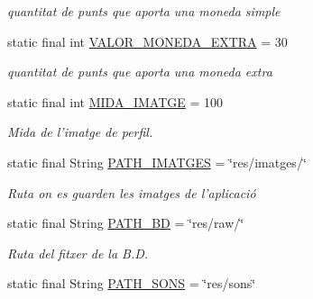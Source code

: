 \begin{DoxyCompactItemize}
\begin{DoxyCompactList}\small\item\em quantitat de punts que aporta una moneda simple \end{DoxyCompactList}\item 
\hypertarget{classlogica_1_1_utils_1_1_constants_a705b60aac1d5b26f649dfd4f140f58f5}{static final int \hyperlink{classlogica_1_1_utils_1_1_constants_a705b60aac1d5b26f649dfd4f140f58f5}{V\+A\+L\+O\+R\+\_\+\+M\+O\+N\+E\+D\+A\+\_\+\+E\+X\+T\+R\+A} = 30}\label{classlogica_1_1_utils_1_1_constants_a705b60aac1d5b26f649dfd4f140f58f5}

\begin{DoxyCompactList}\small\item\em quantitat de punts que aporta una moneda extra \end{DoxyCompactList}\item 
\hypertarget{classlogica_1_1_utils_1_1_constants_a4712ee7a7b1d5c05c32a6cdb6f70b86e}{static final int \hyperlink{classlogica_1_1_utils_1_1_constants_a4712ee7a7b1d5c05c32a6cdb6f70b86e}{M\+I\+D\+A\+\_\+\+I\+M\+A\+T\+G\+E} = 100}\label{classlogica_1_1_utils_1_1_constants_a4712ee7a7b1d5c05c32a6cdb6f70b86e}

\begin{DoxyCompactList}\small\item\em Mida de l'imatge de perfil. \end{DoxyCompactList}\item 
\hypertarget{classlogica_1_1_utils_1_1_constants_a442521d8c78352f361b4b8c35916c0cb}{static final String \hyperlink{classlogica_1_1_utils_1_1_constants_a442521d8c78352f361b4b8c35916c0cb}{P\+A\+T\+H\+\_\+\+I\+M\+A\+T\+G\+E\+S} = \char`\"{}res/imatges/\char`\"{}}\label{classlogica_1_1_utils_1_1_constants_a442521d8c78352f361b4b8c35916c0cb}

\begin{DoxyCompactList}\small\item\em Ruta on es guarden les imatges de l'aplicació \end{DoxyCompactList}\item 
static final String \hyperlink{classlogica_1_1_utils_1_1_constants_a93e52fcb78172fbc1fb7b9b03ac68140}{P\+A\+T\+H\+\_\+\+B\+D} = \char`\"{}res/raw/\char`\"{}
\begin{DoxyCompactList}\small\item\em Ruta del fitxer de la B.\+D. \end{DoxyCompactList}\item 
\hypertarget{classlogica_1_1_utils_1_1_constants_a8b0ba18b306c985bcb23441ba0b36dc1}{static final String \hyperlink{classlogica_1_1_utils_1_1_constants_a8b0ba18b306c985bcb23441ba0b36dc1}{P\+A\+T\+H\+\_\+\+S\+O\+N\+S} = \char`\"{}res/sons\char`\"{}}\label{classlogica_1_1_utils_1_1_constants_a8b0ba18b306c985bcb23441ba0b36dc1}


\end{DoxyCompactItemize}
